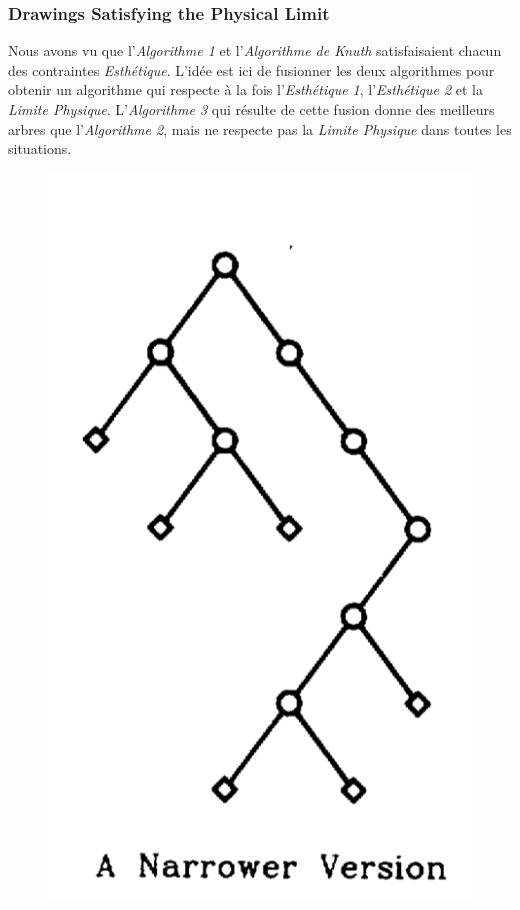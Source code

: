 \documentclass{article}
\begin{document}
\newpage
    \subsubsection{Drawings Satisfying the Physical Limit}

    Nous avons vu que l'\emph{Algorithme 1} et l'\emph{Algorithme de Knuth} satisfaisaient chacun des contraintes \emph{Esthétique}. L'idée est ici de fusionner les deux algorithmes pour obtenir un algorithme qui respecte à la fois l'\emph{Esthétique 1}, l'\emph{Esthétique 2} et la \emph{Limite Physique}. L'\emph{Algorithme 3} qui résulte de cette fusion donne des meilleurs arbres que l'\emph{Algorithme 2}, mais ne respecte pas la \emph{Limite Physique} dans toutes les situations.\\

    \vfill
    \begin{figure}[h]
        \begin{center}
      		\begin{left}
      			\includegraphics[scale=0.4]{arbreBinaireNarrow.png}

\end{left}
\end{center}
\end{figure}
\end{document}
